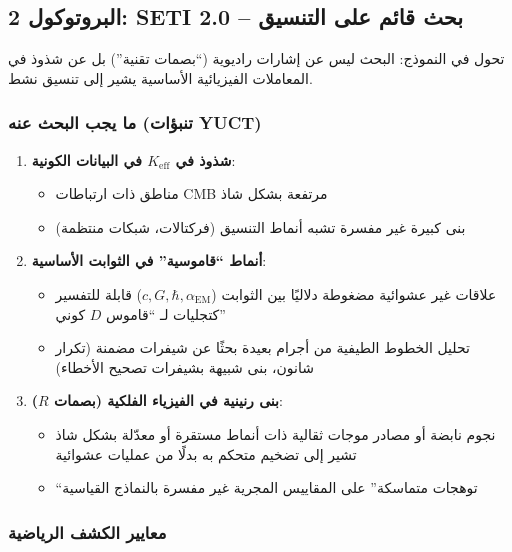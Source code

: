 \documentclass[12pt,a4paper]{article}
\newcommand{\eff}{\mathrm{eff}}
\newcommand{\Ke}{K_{\eff}}
\begin{document}
	\subsection{البروتوكول 2: SETI 2.0 -- بحث قائم على التنسيق}
	
	تحول في النموذج: البحث ليس عن إشارات راديوية (``بصمات تقنية'') بل عن شذوذ في المعاملات الفيزيائية الأساسية يشير إلى تنسيق نشط.
	
	\subsubsection{ما يجب البحث عنه (تنبؤات YUCT)}
	
	\begin{enumerate}
		\item \textbf{شذوذ في \(\Ke\) في البيانات الكونية}:
		\begin{itemize}
			\item مناطق ذات ارتباطات CMB مرتفعة بشكل شاذ
			\item بنى كبيرة غير مفسرة تشبه أنماط التنسيق (فركتالات، شبكات منتظمة)
		\end{itemize}
		
		\item \textbf{أنماط ``قاموسية'' في الثوابت الأساسية}:
		\begin{itemize}
			\item علاقات غير عشوائية مضغوطة دلاليًا بين الثوابت (\(c, G, \hbar, \alpha_{\mathrm{EM}}\)) قابلة للتفسير كتجليات لـ ``قاموس \(D\) كوني''
			\item تحليل الخطوط الطيفية من أجرام بعيدة بحثًا عن شيفرات مضمنة (تكرار شانون، بنى شبيهة بشيفرات تصحيح الأخطاء)
		\end{itemize}
		
		\item \textbf{بنى رنينية في الفيزياء الفلكية (بصمات \(R\))}:
		\begin{itemize}
			\item نجوم نابضة أو مصادر موجات ثقالية ذات أنماط مستقرة أو معدّلة بشكل شاذ تشير إلى تضخيم متحكم به بدلًا من عمليات عشوائية
			\item ``توهجات متماسكة'' على المقاييس المجرية غير مفسرة بالنماذج القياسية
		\end{itemize}
	\end{enumerate}
	
	\subsubsection{معايير الكشف الرياضية}
	
\end{document}
